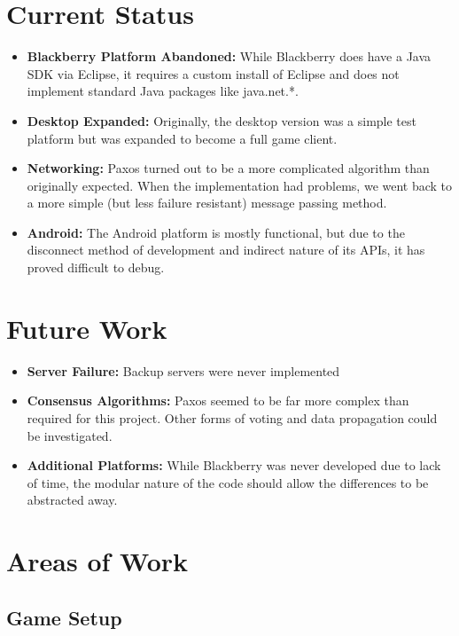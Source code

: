 \documentclass{sig-alternate}
\begin{document}
\section{Current Status}
\label{Status}

\begin{itemize}
	\item \textbf{Blackberry Platform Abandoned:} While Blackberry does
		have a Java SDK via Eclipse, it requires a custom install of
		Eclipse and does not implement standard Java packages like
		java.net.*.
	\item \textbf{Desktop Expanded:} Originally, the desktop version was a
		simple test platform but was expanded to become a full game client.
	\item \textbf{Networking:} Paxos turned out to be a more complicated
		algorithm than originally expected.  When the implementation had
		problems, we went back to a more simple (but less failure
		resistant) message passing method.
	\item \textbf{Android:} The Android platform is mostly functional, but
		due to the disconnect method of development and indirect nature of
		its APIs, it has proved difficult to debug.
\end{itemize}

\section{Future Work}
\label{future}

\begin{itemize}
	\item \textbf{Server Failure:} Backup servers were never implemented
	\item \textbf{Consensus Algorithms:} Paxos seemed to be far more
		complex than required for this project.  Other forms of voting and
		data propagation could be investigated.
	\item \textbf{Additional Platforms:} While Blackberry was never
		developed due to lack of time, the modular nature of the code
		should allow the differences to be abstracted away.
\end{itemize}

\section{Areas of Work}
\label{areas of work}


\subsection{Game Setup}
\end{document}
